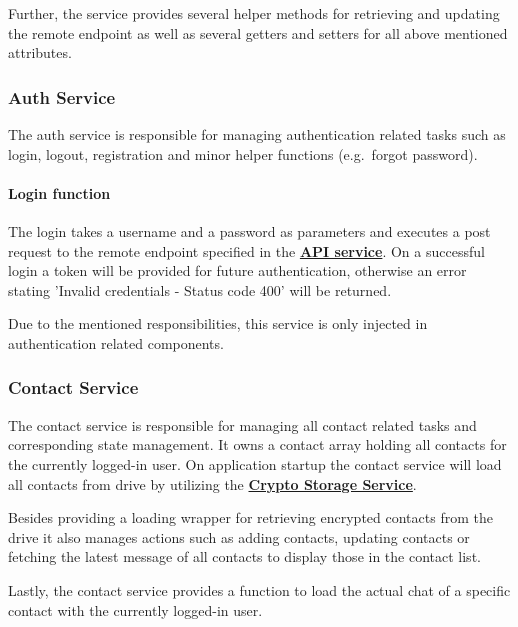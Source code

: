 Further, the service provides several helper methods for retrieving and updating the remote endpoint as well as several
getters and setters for all above mentioned attributes.

\subsubsection{Auth Service}\label{subsubsec:auth-service}
The auth service is responsible for managing authentication related tasks such as login, logout, registration and
minor helper functions (e.g.\ forgot password).

\paragraph{Login function}
The login takes a username and a password as parameters and executes a post request to the remote endpoint specified in
the \textbf{\hyperref[subsubsec:api-service]{API service}}.
On a successful login a token will be provided for future authentication, otherwise an error stating 'Invalid
credentials - Status code 400' will be returned.


Due to the mentioned responsibilities, this service is only injected in authentication related components.

\subsubsection{Contact Service}\label{subsubsec:contact-service}

The contact service is responsible for managing all contact related tasks and corresponding state management.
It owns a contact array holding all contacts for the currently logged-in user.
On application startup the contact service will load all contacts from drive by utilizing the
\textbf{\hyperref[subsubsec:crypto-storage-service]{Crypto Storage Service}}.

Besides providing a loading wrapper for retrieving encrypted contacts from the drive it also manages actions such as
adding contacts, updating contacts or fetching the latest message of all contacts to display those in the contact list.

Lastly, the contact service provides a function to load the actual chat of a specific contact with the currently
logged-in user.

